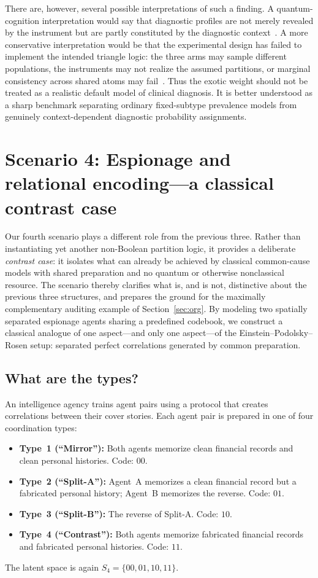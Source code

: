 \documentclass[aps,pra,twocolumn,superscriptaddress,floatfix,longbibliography]{revtex4-2}
\begin{document}
There are, however, several possible interpretations of such a
finding. A quantum-cognition interpretation would say that diagnostic
profiles are not merely revealed by the instrument but are partly
constituted by the diagnostic context~\cite{Busemeyer2012}. A more
conservative interpretation would be that the experimental design has
failed to implement the intended triangle logic: the three arms may
sample different populations, the instruments may not realize the
assumed partitions, or marginal consistency across shared atoms may
fail~\cite{Garg1984}. Thus the exotic weight should not be treated as a realistic
default model of clinical diagnosis. It is better understood as a
sharp benchmark separating ordinary fixed-subtype prevalence models
from genuinely context-dependent diagnostic probability assignments.

\section{Scenario 4: Espionage and relational encoding---a classical
contrast case}
\label{sec:espionage}

Our fourth scenario plays a different role from the previous three.
Rather than instantiating yet another non-Boolean partition logic,
it provides a deliberate \emph{contrast case}: it isolates what can
already be achieved by classical common-cause models with shared
preparation and no quantum or otherwise nonclassical resource. The
scenario thereby clarifies what is, and is not, distinctive about
the previous three structures, and prepares the ground for the
maximally complementary auditing example of
Section~\ref{sec:org}. By modeling two spatially separated espionage
agents sharing a predefined codebook, we construct a classical
analogue of one aspect---and only one aspect---of the
Einstein--Podolsky--Rosen setup: separated perfect correlations
generated by common preparation.

\subsection{What are the types?}

An intelligence agency trains agent pairs using a protocol that
creates correlations between their cover stories. Each agent pair is
prepared in one of four coordination types:
\begin{itemize}
\item \textbf{Type~1 (``Mirror''):} Both agents memorize clean
financial records and clean personal histories. Code: $00$.
\item \textbf{Type~2 (``Split-A''):} Agent~A memorizes a clean
financial record but a fabricated personal history; Agent~B
memorizes the reverse. Code: $01$.
\item \textbf{Type~3 (``Split-B''):} The reverse of Split-A. Code:
$10$.
\item \textbf{Type~4 (``Contrast''):} Both agents memorize
fabricated financial records and fabricated personal histories.
Code: $11$.
\end{itemize}
The latent space is again $S_4=\{00,01,10,11\}$.
\end{document}
